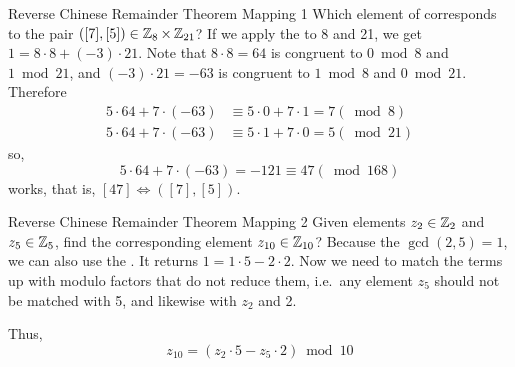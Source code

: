 \begin{example}[]{Reverse Chinese Remainder Theorem Mapping 1}
  Which element of  corresponds to the pair $([7],[5]) \in \operatorname{\mathbb{Z}}_{8} \times \operatorname{\mathbb{Z}}_{21}$?
  \tcblower{}
  If we apply the  to 8 and 21, we get $1 = 8 \cdot 8 + (-3) \cdot 21$.
  Note that $8 \cdot 8 = 64$ is congruent to $0 \bmod 8$ and $1 \bmod 21$, and $(-3) \cdot 21 = -63$ is congruent to $1 \bmod 8$ and $0 \bmod 21$.
  Therefore
  \begin{align*}
    5 \cdot 64+7 \cdot (-63) &\equiv 5 \cdot 0+7 \cdot 1 = 7 (\bmod 8) \\
    5 \cdot 64+7 \cdot (-63) &\equiv 5 \cdot 1+7 \cdot 0 = 5 (\bmod 21)
  \end{align*}
  so,
  \begin{equation*}
    5 \cdot 64 + 7 \cdot (-63) = -121 \equiv 47 (\bmod 168)
  \end{equation*}
  works, that is, $[47] \Leftrightarrow ([7],[5])$.
\end{example}

\begin{example}[]{Reverse Chinese Remainder Theorem Mapping 2}
  Given elements $z_{2} \in \operatorname{\mathbb{Z}}_{2}$ and $z_{5} \in \operatorname{\mathbb{Z}}_{5}$, find the corresponding element $z_{10} \in \operatorname{\mathbb{Z}}_{10}$?
  \tcblower{}
  Because the $\gcd(2, 5) = 1$, we can also use the .
  It returns $1 = 1 \cdot 5 - 2 \cdot 2$.
  Now we need to match the terms up with modulo factors that do not reduce them, i.e.\ any element $z_{5}$ should not be matched with 5, and likewise with $z_{2}$ and 2.

  Thus,
  \begin{equation*}
    z_{10} = (z_{2} \cdot 5 - z_{5} \cdot 2) \bmod 10
  \end{equation*}
\end{example}

